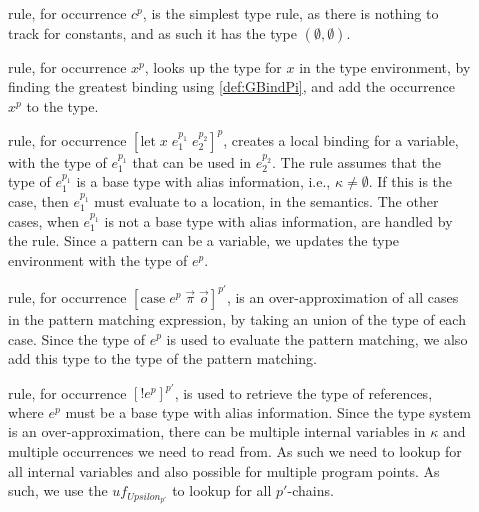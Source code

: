\documentclass{llncs}
\begin{document}
\begin{description}
	\item[] rule, for occurrence $c^p$, is the simplest type rule, as there is nothing to track for constants, and as such it has the type $(\emptyset,\emptyset)$.

	\item[] rule, for occurrence $x^p$, looks up the type for $x$ in the type environment, by finding the greatest binding using \cref{def:GBindPi}, and add the occurrence $x^p$ to the type.

	\item[] rule, for occurrence $[\mbox{let}\;x\;e_1^{p_1}\;e_2^{p_2}]^p$, creates a local binding for a variable, with the type of $e_1^{p_1}$ that can be used in $e_2^{p_2}$.
		The  rule assumes that the type of $e_1^{p_1}$ is a base type with alias information, i.e., $\kappa\neq\emptyset$.
		If this is the case, then $e_1^{p_1}$ must evaluate to a location, in the semantics.
		The other cases, when $e_1^{p_1}$ is not a base type with alias information, are handled by the  rule.
		Since a pattern can be a variable, we updates the type environment with the type of $e^p$.

	\item[] rule, for occurrence $[\mbox{case}\;e^{p}\;\vec{\pi}\;\vec{o}]^{p'}$, is an over-approximation of all cases in the pattern matching expression, by taking an union of the type of each case.
		Since the type of $e^p$ is used to evaluate the pattern matching, we also add this type to the type of the pattern matching.

	\item[] rule, for occurrence $[!e^{p}]^{p'}$, is used to retrieve the type of references, where $e^p$ must be a base type with alias information.
		Since the type system is an over-approximation, there can be multiple internal variables in $\kappa$ and multiple occurrences we need to read from.
		As such we need to lookup for all internal variables and also possible for multiple program points.
		As such, we use the $uf_{Upsilon_{p'}}$ to lookup for all $p'$-chains.
\end{description}

\end{document}
